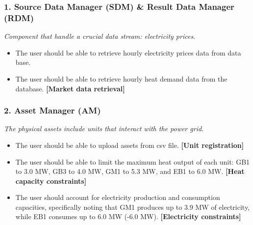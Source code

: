 \subsubsection*{1. Source Data Manager (SDM) \& Result Data Manager (RDM)}
\textit{Component that handle a crucial data stream: electricity prices.}

\begin{itemize}
    \item The user should be able to retrieve hourly electricity prices data from data base.
    \item The user should be able to retrieve hourly heat demand data from the database. \textbf{[Market data retrieval]}
\end{itemize}

\subsubsection*{2. Asset Manager (AM)}
\textit{The physical assets include units that interact with the power grid.}

\begin{itemize}
    \item The user should be able to upload assets from csv file. \textbf{[Unit registration]}
    \item The user should be able to limit the maximum heat output of each unit: GB1 to 3.0 MW, GB3 to 4.0 MW, GM1 to 5.3 MW, and EB1 to 6.0 MW. \textbf{[Heat capacity constraints]}
    \item The user should account for electricity production and consumption capacities, specifically noting that GM1 produces up to 3.9 MW of electricity, while EB1 consumes up to 6.0 MW (-6.0 MW). \textbf{[Electricity constraints]}
\end{itemize}

